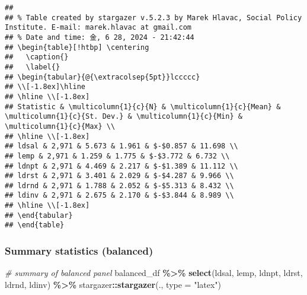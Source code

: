 \documentclass[
]{article}
\newenvironment{Shaded}{\begin{snugshade}}{\end{snugshade}}
\newcommand{\AttributeTok}[1]{\textcolor[rgb]{0.13,0.29,0.53}{#1}}
\newcommand{\CommentTok}[1]{\textcolor[rgb]{0.56,0.35,0.01}{\textit{#1}}}
\newcommand{\FunctionTok}[1]{\textcolor[rgb]{0.13,0.29,0.53}{\textbf{#1}}}
\newcommand{\NormalTok}[1]{#1}
\newcommand{\SpecialCharTok}[1]{\textcolor[rgb]{0.81,0.36,0.00}{\textbf{#1}}}
\newcommand{\StringTok}[1]{\textcolor[rgb]{0.31,0.60,0.02}{#1}}
\begin{document}
\begin{verbatim}
## 
## % Table created by stargazer v.5.2.3 by Marek Hlavac, Social Policy Institute. E-mail: marek.hlavac at gmail.com
## % Date and time: 金, 6 28, 2024 - 21:42:44
## \begin{table}[!htbp] \centering 
##   \caption{} 
##   \label{} 
## \begin{tabular}{@{\extracolsep{5pt}}lccccc} 
## \\[-1.8ex]\hline 
## \hline \\[-1.8ex] 
## Statistic & \multicolumn{1}{c}{N} & \multicolumn{1}{c}{Mean} & \multicolumn{1}{c}{St. Dev.} & \multicolumn{1}{c}{Min} & \multicolumn{1}{c}{Max} \\ 
## \hline \\[-1.8ex] 
## ldsal & 2,971 & 5.673 & 1.961 & $-$0.857 & 11.698 \\ 
## lemp & 2,971 & 1.259 & 1.775 & $-$3.772 & 6.732 \\ 
## ldnpt & 2,971 & 4.469 & 2.217 & $-$1.389 & 11.112 \\ 
## ldrst & 2,971 & 3.401 & 2.029 & $-$4.287 & 9.966 \\ 
## ldrnd & 2,971 & 1.788 & 2.052 & $-$5.313 & 8.432 \\ 
## ldinv & 2,971 & 2.675 & 2.170 & $-$3.844 & 8.989 \\ 
## \hline \\[-1.8ex] 
## \end{tabular} 
## \end{table}
\end{verbatim}

\hypertarget{summary-statistics-balanced}{%
\subsubsection{Summary statistics
(balanced)}\label{summary-statistics-balanced}}

\begin{Shaded}
\begin{Highlighting}[]
\CommentTok{\# summary of balanced panel}
\NormalTok{balanced\_df  }\SpecialCharTok{\%\textgreater{}\%}
  \FunctionTok{select}\NormalTok{(ldsal, lemp, ldnpt, ldrst, ldrnd, ldinv)  }\SpecialCharTok{\%\textgreater{}\%}
\NormalTok{  stargazer}\SpecialCharTok{::}\FunctionTok{stargazer}\NormalTok{(., }\AttributeTok{type =} \StringTok{"latex"}\NormalTok{)}
\end{Highlighting}
\end{Shaded}
\end{document}
